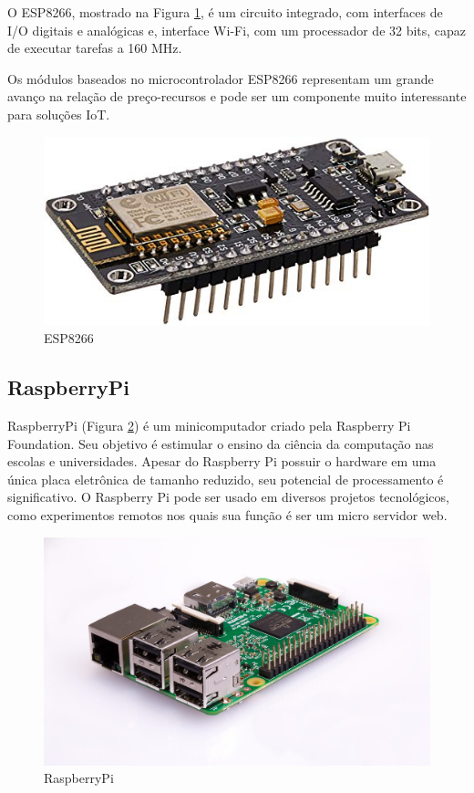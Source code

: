 O ESP8266, mostrado na Figura \ref{fig:esp}, é um circuito integrado, com interfaces de I/O digitais e analógicas e, interface Wi-Fi, com um processador de 32 bits, capaz de executar tarefas a 160 MHz.

Os módulos baseados no microcontrolador ESP8266 representam um grande avanço na relação de preço-recursos e pode ser um componente muito interessante para soluções IoT.\cite {de2017internet}

\begin{figure}[htbp]
		\centering
		\includegraphics[scale=0.5]{figuras/esp8266_.jpg}
		\caption{ESP8266}
		\label{fig:esp}
\end{figure}


\subsection{RaspberryPi}

RaspberryPi (Figura \ref{fig:rpi}) é um minicomputador criado pela Raspberry Pi Foundation. Seu objetivo é estimular o ensino da ciência da computação nas escolas e universidades. Apesar do Raspberry Pi possuir o hardware em uma única placa eletrônica de tamanho reduzido, seu potencial de processamento é significativo. O Raspberry Pi pode ser usado em diversos projetos tecnológicos, como experimentos remotos nos quais sua função é ser um micro servidor web.\cite{crotti2013raspberrypi}

\begin{figure}[htbp]
		\centering
		\includegraphics[scale=0.2]{figuras/raspberrypi.jpg}
		\caption{RaspberryPi}
		\label{fig:rpi}
\end{figure}

